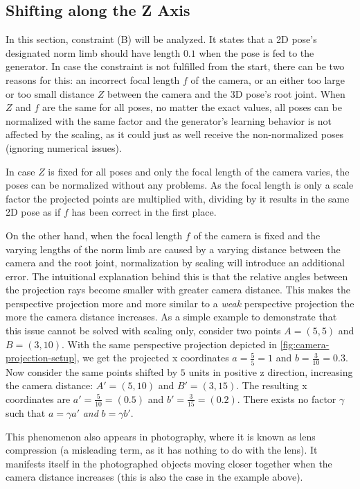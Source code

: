 	
\subsection{Shifting along the Z Axis}
\label{sec:z-shift-error}

In this section, constraint (B) will be analyzed.
It states that a 2D pose's designated norm limb should have length $0.1$ when the pose is fed to the generator.
In case the constraint is not fulfilled from the start, there can be two reasons for this: 
an incorrect focal length $f$ of the camera, or an either too large or too small distance $Z$ between the camera and the 3D pose's root joint.
When $Z$ and $f$ are the same for all poses, no matter the exact values, all poses can be normalized with the same factor and the generator's learning behavior is not affected by the scaling, as it could just as well receive the non-normalized poses (ignoring numerical issues).

In case $Z$ is fixed for all poses and only the focal length of the camera varies, the poses can be normalized without any problems.
As the focal length is only a scale factor the projected points are multiplied with, dividing by it results in the same 2D pose as if $f$ has been correct in the first place.

On the other hand, when the focal length $f$ of the camera is fixed and the varying lengths of the norm limb are caused by a varying distance between the camera and the root joint, normalization by scaling will introduce an additional error.
The intuitional explanation behind this is that the relative angles between the projection rays become smaller with greater camera distance.
This makes the perspective projection more and more similar to a \emph{weak} perspective projection the more the camera distance increases.
As a simple example to demonstrate that this issue cannot be solved with scaling only, consider two points $A = (5, 5)$ and $B = (3, 10)$. 
With the same perspective projection depicted in \autoref{fig:camera-projection-setup}, we get the projected x coordinates $a = \frac{5}{5} = 1$ and $b = \frac{3}{10} = 0.3$.
Now consider the same points shifted by $5$ units in positive z direction, increasing the camera distance: $A' = (5, 10)$ and $B' = (3, 15)$.
The resulting x coordinates are $a' = \frac{5}{10} = (0.5)$ and $b' = \frac{3}{15} = (0.2)$.
There exists no factor $\gamma$ such that $a = \gamma a'$ \emph{and} $b = \gamma b'$.

This phenomenon also appears in photography, where it is known as lens compression (a misleading term, as it has nothing to do with the lens).
It manifests itself in the photographed objects moving closer together when the camera distance increases (this is also the case in the example above).

